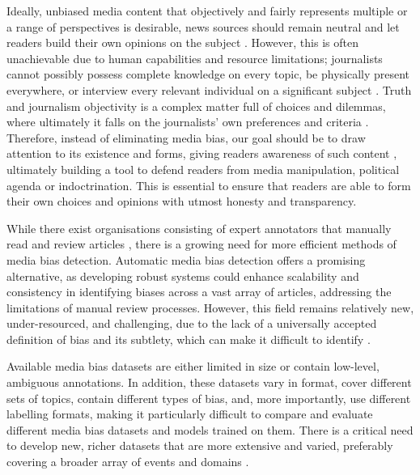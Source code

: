 Ideally, unbiased media content that objectively and fairly represents multiple or a range of perspectives is desirable, news sources should remain neutral and let readers build their own opinions on the subject \cite{reuters-2021-digital-news-report}. However, this is often unachievable due to human capabilities and resource limitations; journalists cannot possibly possess complete knowledge on every topic, be physically present everywhere, or interview every relevant individual on a significant subject \cite{allsides-2022-bias-definition}. Truth and journalism objectivity is a complex matter full of choices and dilemmas, where ultimately it falls on the journalists' own preferences and criteria \cite{boudana-2011-journalistic-objectivity}. Therefore, instead of eliminating media bias, our goal should be to draw attention to its existence and forms, giving readers awareness of such content \cite{spinde-2024-taxonomy}, ultimately building a tool to defend readers from media manipulation, political agenda or indoctrination. This is essential to ensure that readers are able to form their own choices and opinions with utmost honesty and transparency.

While there exist organisations consisting of expert annotators that manually read and review articles \cite{adfontes, allsides, mbfc}, there is a growing need for more efficient methods of media bias detection. Automatic media bias detection offers a promising alternative, as developing robust systems could enhance scalability and consistency in identifying biases across a vast array of articles, addressing the limitations of manual review processes. However, this field remains relatively new, under-resourced, and challenging, due to the lack of a universally accepted definition of bias and its subtlety, which can make it difficult to identify \cite{rodrigo-2024-systematic-review-media-bias}.

Available media bias datasets \cite{spinde-2021-babe,fan-2019-basil,chen-2020-nlpcss,spinde-2023-bat,gruppi-2023-nela-gt-2022} are either limited in size or contain low-level, ambiguous annotations. In addition, these datasets vary in format, cover different sets of topics, contain different types of bias, and, more importantly, use different labelling formats, making it particularly difficult to compare and evaluate different media bias datasets and models trained on them. There is a critical need to develop new, richer datasets that are more extensive and varied, preferably covering a broader array of events and domains \cite{rodrigo-2024-systematic-review-media-bias}.

